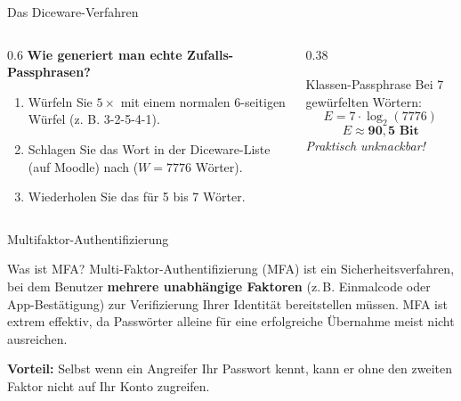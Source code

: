 \documentclass[10pt, aspectratio=169]{beamer}
\begin{document}
\begin{frame}{Das Diceware-Verfahren}
  \begin{columns}[c]
    \begin{column}{0.6\textwidth}
      \pause
      \textbf{Wie generiert man echte Zufalls-Passphrasen?}
      \begin{enumerate}
        \pause
        \item Würfeln Sie $5\times$ mit einem normalen 6-seitigen Würfel (z. B. 3-2-5-4-1).
        \pause
        \item Schlagen Sie das Wort in der Diceware-Liste (auf Moodle) nach ($W=7776$ Wörter).
        \pause
        \item Wiederholen Sie das für 5 bis 7 Wörter.
      \end{enumerate}
    \end{column}
    \pause
    \begin{column}{0.38\textwidth}
      \begin{block}{Klassen-Passphrase}
        Bei 7 gewürfelten Wörtern:
        \[ E = 7 \cdot \log_2(7776) \]
        \[ E \approx \mathbf{90{,}5\text{ Bit}} \]
        \pause
        \textit{Praktisch unknackbar!}
      \end{block}
    \end{column}
  \end{columns}
\end{frame}

\begin{frame}{Multifaktor-Authentifizierung}
  \pause
  \begin{block}{Was ist MFA?}
    Multi-Faktor-Authentifizierung (MFA) ist ein Sicherheitsverfahren, bei dem Benutzer \textbf{mehrere unabhängige Faktoren} (z.\,B. Einmalcode oder App-Bestätigung) zur Verifizierung Ihrer Identität bereitstellen müssen. MFA ist extrem effektiv, da Passwörter alleine für eine erfolgreiche Übernahme meist nicht ausreichen. 
  \end{block}
  
  \pause
  \vspace{0.8em}
  \textbf{Vorteil:} Selbst wenn ein Angreifer Ihr Passwort kennt, kann er ohne den zweiten Faktor nicht auf Ihr Konto zugreifen.
\end{frame}
\end{document}
